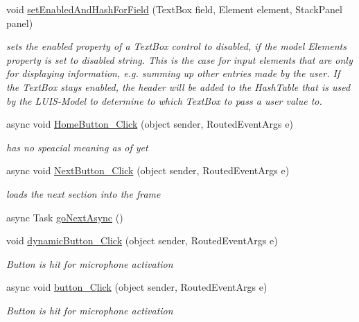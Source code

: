 \begin{DoxyCompactItemize}
void \hyperlink{class_listen_to_me_1_1_main_page_a80911257473f608abc125a1083045041}{set\+Enabled\+And\+Hash\+For\+Field} (Text\+Box field, Element element, Stack\+Panel panel)
\begin{DoxyCompactList}\small\item\em sets the enabled property of a Text\+Box control to disabled, if the model Element\textquotesingle{}s property is set to \textquotesingle{}disabled\textquotesingle{} string. This is the case for input elements that are only for displaying information, e.\+g. summing up other entries made by the user. If the Text\+Box stays enabled, the header will be added to the Hash\+Table that is used by the L\+U\+I\+S-\/\+Model to determine to which Text\+Box to pass a user value to. \end{DoxyCompactList}\item 
async void \hyperlink{class_listen_to_me_1_1_main_page_a4dec5880c4a900edea6e9a2f37cd93fc}{Home\+Button\+\_\+\+Click} (object sender, Routed\+Event\+Args e)
\begin{DoxyCompactList}\small\item\em has no speacial meaning as of yet \end{DoxyCompactList}\item 
async void \hyperlink{class_listen_to_me_1_1_main_page_a8144f2438fc2512708677190d74d2111}{Next\+Button\+\_\+\+Click} (object sender, Routed\+Event\+Args e)
\begin{DoxyCompactList}\small\item\em loads the next section into the frame \end{DoxyCompactList}\item 
async Task \hyperlink{class_listen_to_me_1_1_main_page_a8cd1a04a404800cfab55de0ba4466f68}{go\+Next\+Async} ()
\item 
void \hyperlink{class_listen_to_me_1_1_main_page_acad3fb1a64c0bea077f5ad38627faeef}{dynamic\+Button\+\_\+\+Click} (object sender, Routed\+Event\+Args e)
\begin{DoxyCompactList}\small\item\em Button is hit for microphone activation \end{DoxyCompactList}\item 
async void \hyperlink{class_listen_to_me_1_1_main_page_afee59bda6fcfb361bf088d543e197879}{button\+\_\+\+Click} (object sender, Routed\+Event\+Args e)
\begin{DoxyCompactList}\small\item\em Button is hit for microphone activation \end{DoxyCompactList}\item 

\end{DoxyCompactItemize}
